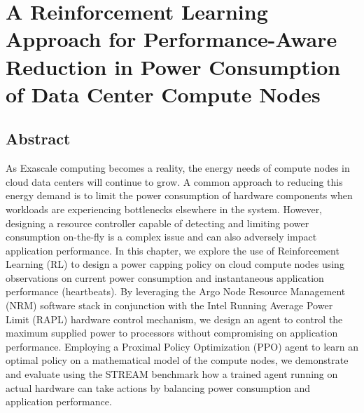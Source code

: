 

\chapter{A Reinforcement Learning Approach for Performance-Aware Reduction in Power Consumption of Data Center Compute Nodes} \label{CH4_IC2E}

\graphicspath{{Papers/IC2E/}}

\section*{Abstract}
As Exascale computing becomes a reality, the energy needs of compute nodes in cloud
data centers will continue to grow. A common approach to reducing this energy demand
is to limit the power consumption of hardware components when workloads are
experiencing bottlenecks elsewhere in the system. However, designing a resource
controller capable of detecting and limiting power consumption on-the-fly is a
complex issue and can also adversely impact application performance. In this chapter,
we explore the use of Reinforcement Learning (RL) to design a power capping policy
on cloud compute nodes using observations on current power consumption and
instantaneous application performance (heartbeats). By leveraging the Argo Node
Resource Management (NRM) software stack in conjunction with the Intel Running
Average Power Limit (RAPL) hardware control mechanism, we design an agent to
control the maximum supplied power to processors without compromising on application
performance. Employing a Proximal Policy Optimization (PPO) agent to learn an
optimal policy on a mathematical model of the compute nodes, we demonstrate and
evaluate using the STREAM benchmark how a trained agent running on actual hardware
can take actions by balancing power consumption and application performance.



